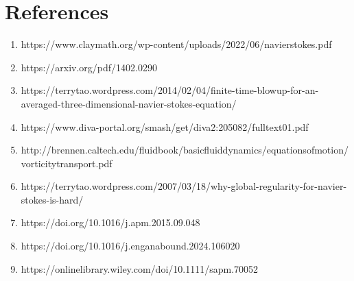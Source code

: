 \documentclass[12pt]{article}
\begin{document}
\section{References}
\begin{enumerate}
    \item https://www.claymath.org/wp-content/uploads/2022/06/navierstokes.pdf
    \item https://arxiv.org/pdf/1402.0290
    \item https://terrytao.wordpress.com/2014/02/04/finite-time-blowup-for-an-averaged-three-dimensional-navier-stokes-equation/
    \item https://www.diva-portal.org/smash/get/diva2:205082/fulltext01.pdf
    \item http://brennen.caltech.edu/fluidbook/basicfluiddynamics/equationsofmotion/
    vorticitytransport.pdf
    \item https://terrytao.wordpress.com/2007/03/18/why-global-regularity-for-navier-stokes-is-hard/
    \item https://doi.org/10.1016/j.apm.2015.09.048
    \item https://doi.org/10.1016/j.enganabound.2024.106020
    \item https://onlinelibrary.wiley.com/doi/10.1111/sapm.70052
\end{enumerate}
 
\BibTexMode{%
   
   
}%
\BibLatexMode{\printbibliography}
\end{document}
